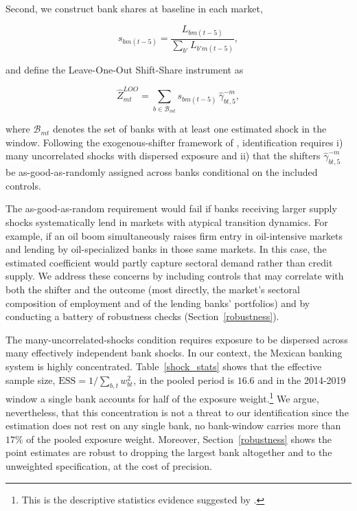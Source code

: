 \documentclass[12pt]{article}
\begin{document}
Second, we construct bank shares at baseline in each market, 

\begin{equation}
    s_{bm(t-5)} = \frac{L_{bm(t-5)}}{\sum_{b'} L_{b'm(t-5)}},
\end{equation}

and define the Leave-One-Out Shift-Share instrument as

\begin{equation}
    \hat{Z}_{mt}^{LOO} = \sum_{b \in \mathcal{B}_{mt}} s_{bm(t-5)}\, \hat{\gamma}_{bt,5}^{-m},
\end{equation}

where $\mathcal{B}_{mt}$ denotes the set of banks with at least one estimated shock in the window. Following the exogenous-shifter framework of \citet{borusyak2022quasi}, identification requires i) many uncorrelated shocks with dispersed exposure and ii) that the shifters $\hat{\gamma}_{bt,5}^{-m}$ be as-good-as-randomly assigned across banks conditional on the included controls. 

The as-good-as-random requirement would fail if banks receiving larger supply shocks systematically lend in markets with atypical transition dynamics. For example, if an oil boom simultaneously raises firm entry in oil-intensive markets and lending by oil-specialized banks in those same markets. In this case, the estimated coefficient would partly capture sectoral demand rather than credit supply. We address these concerns by including controls that may correlate with both the shifter and the outcome (most directly, the market's sectoral composition of employment and of the lending banks' portfolios) and by conducting a battery of robustness checks (Section~\ref{robustness}). 

The many-uncorrelated-shocks condition requires exposure to be dispersed across many effectively independent bank shocks. In our context, the Mexican banking system is highly concentrated. Table~\ref{shock_stats} shows that the effective sample size, $\mathrm{ESS}=1/\sum_{b,t} w_{bt}^{2}$, in the pooled period is $16.6$ and in the 2014-2019 window a single bank accounts for half of the exposure weight.\footnote{This is the descriptive statistics evidence suggested by \citet{borusyak2022quasi}.} We argue, nevertheless, that this concentration is not a threat to our identification since the estimation does not rest on any single bank, no bank-window carries more than $17\%$ of the pooled exposure weight. Moreover, Section~\ref{robustness} shows the point estimates are robust to dropping the largest bank altogether and to the unweighted specification, at the cost of precision.
\end{document}
